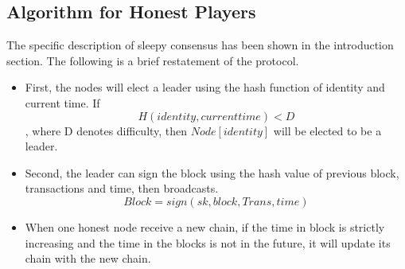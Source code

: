 \documentclass{llncs}
\begin{document}
\subsection{Algorithm for Honest Players}
\quad The specific description of sleepy consensus has been shown in the introduction section. The following is a brief restatement of the protocol.
\begin{itemize}
	\item First, the nodes will elect a leader using the hash function of identity and current time. If
		 $$H(identity, current time) < D$$,
		 where D denotes difficulty, then $Node[identity]$ will be elected to be a leader.\\
	\item Second, the leader can sign the block using the hash value of previous block, transactions and time, then broadcasts.
		 $$Block = sign(sk, block, Trans, time)$$
	\item When one honest node receive a new chain, if the time in block is strictly increasing and the time in the blocks is not in the future, it will update its chain with the new chain.	
\end{itemize}
\end{document}
